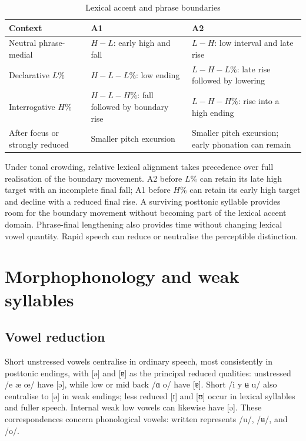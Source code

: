 \begin{table}[!ht]
    \caption{Lexical accent and phrase boundaries}
    \label{tab:accent-intonation}
    \begin{tabularx}{\textwidth}{X X X}
        \toprule
        \rowcolor{grammarTableHead}
        \textbf{Context} & \textbf{A1} & \textbf{A2} \\
        \midrule
        Neutral phrase-medial & $H-L$: early high and fall & $L-H$: low interval and late rise \\
        Declarative $L\%$ & $H-L-L\%$: low ending & $L-H-L\%$: late rise followed by lowering \\
        Interrogative $H\%$ & $H-L-H\%$: fall followed by boundary rise & $L-H-H\%$: rise into a high ending \\
        After focus or strongly reduced & Smaller pitch excursion & Smaller pitch excursion; early phonation can remain \\
        \bottomrule
    \end{tabularx}
\end{table}

Under tonal crowding, relative lexical alignment takes precedence over full realisation of the boundary movement. A2 before $L\%$ can retain its late high target with an incomplete final fall; A1 before $H\%$ can retain its early high target and decline with a reduced final rise. A surviving posttonic syllable provides room for the boundary movement without becoming part of the lexical accent domain. Phrase-final lengthening also provides time without changing lexical vowel quantity. Rapid speech can reduce or neutralise the perceptible distinction.

\FloatBarrier
\section{Morphophonology and weak syllables}
\label{sec:weak-vowels}

\subsection{Vowel reduction}

Short unstressed vowels centralise in ordinary speech, most consistently in posttonic endings, with [ə] and [ɐ] as the principal reduced qualities: unstressed /e æ œ/ have [ə], while low or mid back /ɑ o/ have [ɐ]. Short /i y ʉ u/ also centralise to [ə] in weak endings; less reduced [ɪ] and [ʊ] occur in lexical syllables and fuller speech. Internal weak low vowels can likewise have [ə]. These correspondences concern phonological vowels: written  represents /u/,  /ʉ/, and  /o/.

